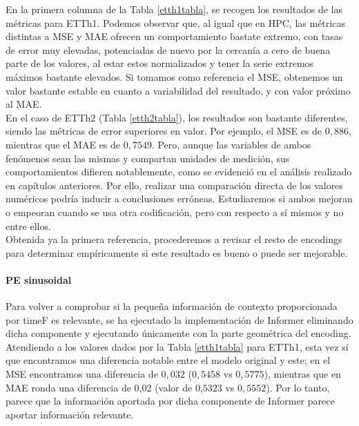 En la primera columna de la Tabla \ref{etth1tabla}, se recogen los resultados de las métricas para ETTh1. Podemos observar que, al igual que en HPC, las métricas distintas a MSE y MAE ofrecen un comportamiento bastate extremo, con tasas de error muy elevadas, potenciadas de nuevo por la cercanía a cero de buena parte de los valores, al estar estos normalizados y tener la serie extremos máximos bastante elevados. Si tomamos como referencia el MSE, obtenemos un valor bastante estable en cuanto a variabilidad del resultado, y con valor próximo al MAE.\\

En el caso de ETTh2 (Tabla \ref{etth2tabla}), los resultados son bastante diferentes, siendo las métricas de error superiores en valor. Por ejemplo, el MSE es de $0,886$, mientras que el MAE es de $0,7549$. Pero, aunque las variables de ambos fenómenos sean las mismas y compartan unidades de medición, sus comportamientos difieren notablemente, como se evidenció en el análisis realizado en capítulos anteriores. Por ello, realizar una comparación directa de los valores numéricos podría inducir a conclusiones erróneas. Estudiaremos si ambos mejoran o empeoran cuando se usa otra codificación, pero con respecto a sí mismos y no entre ellos.\\

Obtenida ya la primera referencia, procederemos a revisar el resto de encodings para determinar empíricamente si este resultado es bueno o puede ser mejorable.
 
 
\paragraph{PE sinusoidal}
 
 Para volver a comprobar si la pequeña información de contexto proporcionada por timeF es relevante, se ha ejecutado la implementación de Informer eliminando dicha componente y ejecutando únicamente con la parte geométrica del encoding.\\
  
  Atendiendo a los valores dados por la Tabla \ref{etth1tabla} para ETTh1, esta vez sí que encontramos una diferencia notable entre el modelo original y este; en el MSE encontramos una diferencia de $0,032$ ($0,5458$ vs $0,5775$), mientras que en MAE ronda una diferencia de 0,02 (valor de 0,$5323$ vs $0,5552$). Por lo tanto, parece que la información aportada por dicha componente de Informer parece aportar información relevante.\\
  
